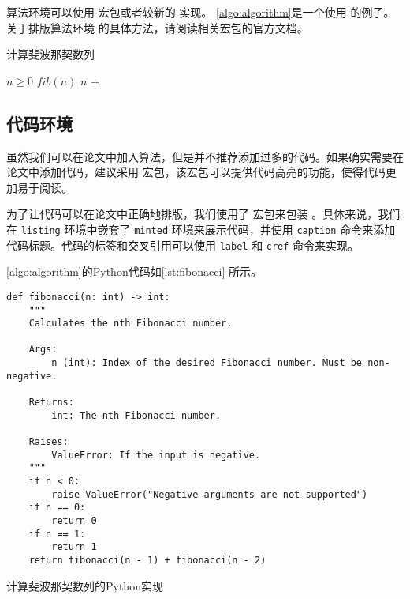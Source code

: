 算法环境可以使用  宏包或者较新的  实现。
\cref{algo:algorithm}是一个使用  的例子。关于排版算法环境
的具体方法，请阅读相关宏包的官方文档。

\begin{algorithm}
    \caption{计算斐波那契数列}\label{algo:algorithm}
    \begin{algorithmic}[1]
        \Require $n \geq 0$
        \Ensure $fib(n)$
        \State \Return $n$
        \Else
        \State \Return {} + 
        \EndIf
        \EndFunction
    \end{algorithmic}
\end{algorithm}

\subsection{代码环境}

虽然我们可以在论文中加入算法，但是并不推荐添加过多的代码。如果确实需要在论文中添加代码，建议采用  宏包，该宏包可以提供代码高亮的功能，使得代码更加易于阅读。

为了让代码可以在论文中正确地排版，我们使用了  宏包来包装 。具体来说，我们在 \texttt{listing} 环境中嵌套了 \texttt{minted} 环境来展示代码，并使用 \texttt{caption} 命令来添加代码标题。代码的标签和交叉引用可以使用 \texttt{label} 和 \texttt{cref} 命令来实现。

\cref{algo:algorithm}的Python代码如\cref{lst:fibonacci} 所示。



\begin{listing}[htbp]
\begin{verbatim}
def fibonacci(n: int) -> int:
    """
    Calculates the nth Fibonacci number.

    Args:
        n (int): Index of the desired Fibonacci number. Must be non-negative.

    Returns:
        int: The nth Fibonacci number.

    Raises:
        ValueError: If the input is negative.
    """
    if n < 0:
        raise ValueError("Negative arguments are not supported")
    if n == 0:
        return 0
    if n == 1:
        return 1
    return fibonacci(n - 1) + fibonacci(n - 2)
\end{verbatim}
\caption{计算斐波那契数列的Python实现}\label{lst:fibonacci}
\end{listing}

